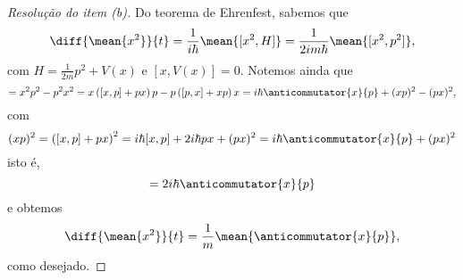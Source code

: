 \begin{proof}[Resolução do item (b)]
    Do teorema de Ehrenfest, sabemos que
    \begin{equation*}
        \diff{\mean{x^2}}{t} = \frac{1}{i\hbar} \mean{[x^2, H]} = \frac1{2i m \hbar}\mean{[x^2, p^2]},
    \end{equation*}
    com \(H = \frac{1}{2m}p^2 + V(x)\) e \([x, V(x)] = 0\). Notemos ainda que
    \begin{equation*}
        [x^2, p^2] = x^2 p^2 - p^2 x^2 = x \left([x,p] + px\right) p - p\left([p,x] + xp\right)x = i \hbar \anticommutator{x}{p} + (xp)^2 - (px)^2 ,
    \end{equation*}
    com
    \begin{equation*}
        (xp)^2 = \left([x,p] + px\right)^2 = i\hbar [x,p] +  2i\hbar px + (px)^2 = i \hbar \anticommutator{x}{p} + (px)^2
    \end{equation*}
    isto é,
    \begin{equation*}
        [x^2, p^2] = 2i\hbar \anticommutator{x}{p}
    \end{equation*}
    e obtemos
    \begin{equation*}
        \diff{\mean{x^2}}{t} = \frac{1}{m}\mean{\anticommutator{x}{p}},
    \end{equation*}
    como desejado.
\end{proof}
